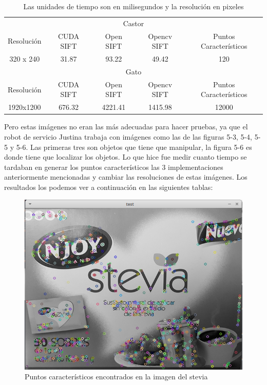 \begin{table}[htb]
\centering
\begin{tabular}{|c|c|c|c|c|}
\hline

\multicolumn{5}{|c|}{Castor} \\
\cline{1-5}
Resolución & CUDA SIFT & Open SIFT & Opencv SIFT & Puntos Característicos\\
\hline \hline
 320 x 240  & 31.87   &   93.22  &  49.42   & 120\\ \cline{1-5}
\hline \hline
\multicolumn{5}{|c|}{Gato} \\
\cline{1-5}
Resolución & CUDA SIFT & Open SIFT & Opencv SIFT & Puntos Característicos\\
\hline \hline
1920x1200  & 676.32 &  4221.41 & 1415.98   & 12000\\ \cline{1-5}


\end{tabular}
\caption{Las unidades de tiempo son en milisegundos y la resolución en pixeles}
\label{tabla:final}
\end{table}






\pagebreak


Pero estas imágenes no eran las más adecuadas para hacer pruebas, ya que el robot de servicio Justina trabaja con imágenes como las de las figuras 5-3, 5-4, 5-5 y 5-6. Las primeras tres son objetos que tiene que manipular, la figura 5-6 es donde tiene que localizar los objetos.
Lo que hice fue medir cuanto tiempo se tardaban en generar los puntos característicos las 3 implementaciones anteriormente mencionadas y cambiar las resoluciones de estas imágenes. Los resultados los podemos ver a continuación en las siguientes tablas:


\begin{figure}[ph]
			\centering
				\includegraphics[scale=0.70]{img/stevia.png}
			\caption{Puntos característicos encontrados en la imagen del stevia}
\end{figure}


